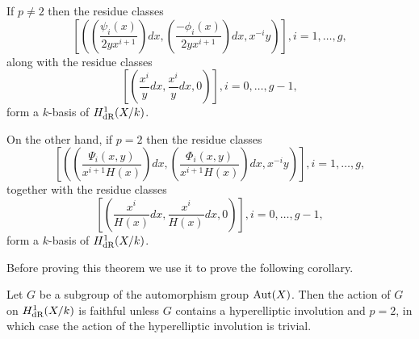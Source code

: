     \begin{thm}\label{theorembasisofderham}
    If $p \neq 2$ then the residue classes 
        \begin{equation}\label{equationhonebasiselementofderhampnot2}
         \left[ \left( \left( \frac{\psi_i(x)}{2yx^{i+1}}\right) dx, \left(\frac{-\phi_i(x)}{2yx^{i+1}}\right) dx, x^{-i}y \right)\right] , i=1, \ldots ,g,
        \end{equation}
    along with the residue classes 
        \begin{equation}\label{equationhzerobasiselementofderhampnot2}
         \left[ \left( \frac{x^{i}}{y} dx , \frac{x^{i}}{y} dx, 0 \right)\right] , i = 0,\ldots ,g-1,
        \end{equation}
    form a $k$-basis of $H_{\text {dR}}^1(X/k)$.
    
    On the other hand, if $p=2$ then the residue classes 
        \begin{equation}\label{equationhonebasiselementofderhampis2}
        \left[ \left( \left(\frac{\Psi_i(x,y)}{x^{i+1}H(x)}\right) dx, \left( \frac{\Phi_i(x,y)}{x^{i+1}H(x)} \right) dx, x^{-i}y \right)\right], i =1, \ldots , g,
        \end{equation}
    together with the residue classes 
        \begin{equation}\label{equationhzerobasiselementofderhampis2}
        \left[ \left( \frac{x^{i}}{H(x)} dx, \frac{x^{i}}{H(x)} dx, 0 \right)\right], i=0, \ldots, g-1,
        \end{equation}
    form a $k$-basis of $H_{\text {dR}}^1(X/k)$.
    \end{thm}

Before proving this theorem we use it to prove the following corollary.

    \begin{cor}\label{corfaithfulactiononderhamhone}
    Let $G$ be a subgroup of the automorphism group $\operatorname{Aut}(X)$.
    Then the action of $G$ on $H_{\text {dR}}^1(X/k)$ is faithful unless $G$ contains a hyperelliptic involution and $p=2$, in which case the action of the hyperelliptic involution is trivial.
    \end{cor}

